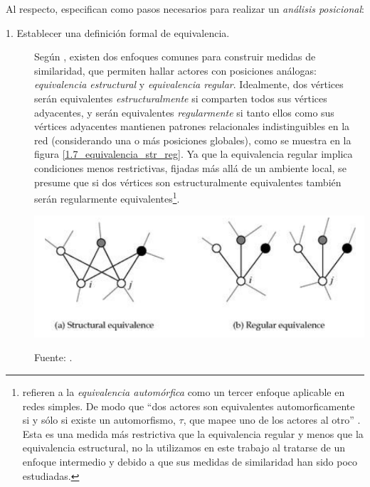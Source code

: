 \documentclass[letterpaper, 11pt]{book}
\theoremstyle{definition}
\theoremstyle{remark}
\begin{document}
Al respecto, \citet{1994_Wasserman_SNA} especifican como pasos necesarios para realizar un \emph{análisis posicional}: 
\begin{description}
    \item[1. Establecer una definición formal de equivalencia.] 
    Según \citet{2010_Newman_Networks}, existen dos enfoques comunes para construir medidas de similaridad, que permiten hallar actores con posiciones análogas: 
    \emph{equivalencia estructural} y \emph{equivalencia regular}. 
    Idealmente, dos vértices serán equivalentes \emph{estructuralmente} si comparten todos sus vértices adyacentes, y serán equivalentes \emph{regularmente} si tanto ellos como sus vértices adyacentes mantienen patrones relacionales indistinguibles en la red (considerando una o más posiciones globales), como se muestra en la figura \ref{1.7_equivalencia_str_reg}. 
    Ya que la equivalencia regular implica condiciones menos restrictivas, fijadas más allá de un ambiente local, se presume que si dos vértices son estructuralmente equivalentes también serán regularmente equivalentes\footnote{
	\citet{1994_Wasserman_SNA} refieren a la \emph{equivalencia automórfica} como un tercer enfoque aplicable en redes simples. 
	De modo que ``dos actores son equivalentes automorficamente si y sólo si existe un automorfismo, $\tau$, que mapee uno de los actores al otro'' \citep[470]{1994_Wasserman_SNA}. 
	Esta es una medida más restrictiva que la equivalencia regular y menos que la equivalencia estructural, no la utilizamos en este trabajo al tratarse de un enfoque intermedio y debido a que sus medidas de similaridad han sido poco estudiadas. 
    }. 
    
    
\begin{minipage}{\linewidth}
    \centering
     \label{1.7_equivalencia_str_reg}
    \includegraphics[scale=.4]{img/1.7_equivalencia_str_reg.png}
    \par\bigskip
    \small Fuente: \citep[214]{2010_Newman_Networks}. 
\end{minipage}\medskip


\end{description}
\end{document}
